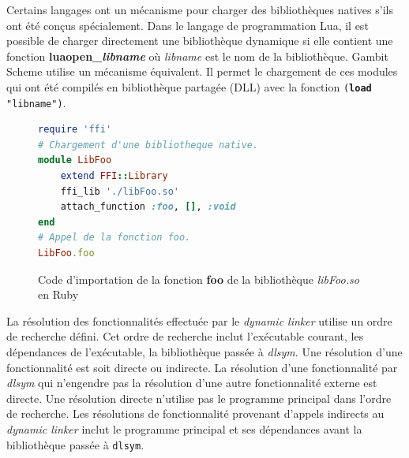 Certains langages ont un mécanisme pour charger des bibliothèques natives s'ils
ont été conçus spécialement.  Dans le langage de programmation Lua, il est
possible de charger directement une bibliothèque dynamique si elle contient une
fonction \textbf{luaopen\_\textit{libname}} où \textit{libname} est le nom de
la bibliothèque.  Gambit Scheme utilise un mécanisme équivalent. Il permet le
chargement de ces modules qui ont été compilés en bibliothèque partagée (DLL)
avec la fonction \texttt{(\textbf{load} "libname")}.


\begin{center}
\begin{figure}[ht]
\begin{lstlisting}[language=ruby,frame=single]
require 'ffi'
# Chargement d'une bibliotheque native.
module LibFoo
    extend FFI::Library
    ffi_lib './libFoo.so'
    attach_function :foo, [], :void
end
# Appel de la fonction foo.
LibFoo.foo
\end{lstlisting}
\caption{Code d'importation de la fonction \textbf{foo} de la bibliothèque
  \textit{libFoo.so} en Ruby}
\end{figure}
\end{center}

La résolution des fonctionnalités effectuée par le \textit{dynamic linker}
utilise un ordre de recherche défini. Cet ordre de recherche inclut
l'exécutable courant, les dépendances de l'exécutable, la bibliothèque passée à
\textit{dlsym}. Une résolution d'une fonctionnalité est soit directe ou
indirecte. La résolution d'une fonctionnalité par \textit{dlsym} qui n'engendre
pas la résolution d'une autre fonctionnalité externe est directe. Une résolution
directe n'utilise pas le programme principal dans l'ordre de recherche.
Les résolutions de fonctionnalité provenant d'appels indirects au
\textit{dynamic linker} inclut le programme principal et ses dépendances avant
la bibliothèque passée à \verb|dlsym|.

